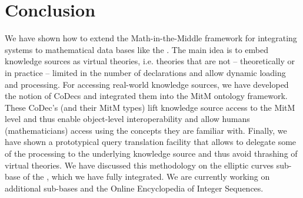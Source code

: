 \section{Conclusion}\label{sec:concl}

We have shown how to extend the Math-in-the-Middle framework for integrating systems to mathematical data bases like the \lmfdb. 
The main idea is to embed knowledge sources as virtual theories, i.e. theories that are not -- theoretically or in practice -- limited in the number of declarations and allow dynamic loading and processing. 
For accessing real-world knowledge sources, we have developed the notion of CoDecs and integrated them into the MitM ontology framework. 
These CoDec's (and their MitM types) lift knowledge source access to the MitM level and thus enable object-level interoperability and allow humans (mathematicians) access using the concepts they are familiar with. 
Finally, we have shown a prototypical query translation facility that allows to delegate some of the processing to the underlying knowledge source and thus avoid thrashing of virtual theories. 
We have discussed this methodology on the elliptic curves sub-base of the \lmfdb, which we have fully integrated. 
We are currently working on additional \lmfdb sub-bases and the Online Encyclopedia of Integer Sequences. 



